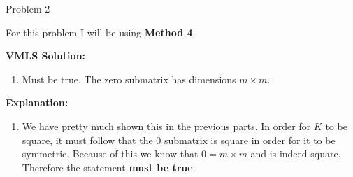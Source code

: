 \begin{problem}{Problem 2}
    \begin{Highlight}
        For this problem I will be using \textbf{Method 4}. \vspace*{1em}

        \noindent \textbf{VMLS Solution:}

        \begin{enumerate}[label = (\alph*), start = 5]
            \item Must be true. The zero submatrix has dimensions $m \times m$.
        \end{enumerate}

        \noindent \textbf{Explanation:}

        \begin{enumerate}[label = (\alph*), start = 5]
            \item We have pretty much shown this in the previous parts. In order for $K$ to be square, it must follow that the 0 submatrix is square in order for it to be symmetric. Because of this
            we know that $0 = m \times m$ and is indeed square. Therefore the statement \textbf{must be true}.
        \end{enumerate}
    \end{Highlight}
\end{problem}

